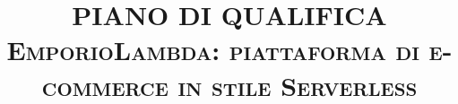 


\newcommand{\pathToTemplate}{../../Template/Documento}

\newcommand{\docNome}{ PIANO DI QUALIFICA }
\newcommand{\docVersione}{4.0.0}
\newcommand{\docNomeProgetto}{ EmporioLambda: piattaforma di e-commerce in stile Serverless }
\newcommand{\docStatus}{approvato}
\newcommand{\docUso}{esterno}
\newcommand{\docDescrizione}{
    \begin{center}
    Documento di definizione delle strategie di verifica e validazione
    \end{center}
}


\newcommand{\docRedattori}{
	Marco Canovese \\&
    Michele Veronesi 
    
    
}
\newcommand{\docVerificatori}{
    Nicole Davanzo \\&
	Stefano Lazzaroni \\&
    Francesco Trolese
}
\newcommand{\docApprovazione}{
    Marco Canovese
}

\newcommand{\nomeCorso}{
    Ingegneria del Software - Università degli Studi di Padova
}



\documentclass[11pt,a4paper,table]{article}

    


\title{ \hr \huge \textsc{\docNome} \\ 
        \vspace{11pt} \large \textsc{\docNomeProgetto} \hr}

\author{} %
\date{} %


 





\newpage
{}
\addtocounter{table}{-1}


\tableofcontents
\listoffigures
\listoftables


\newpage







